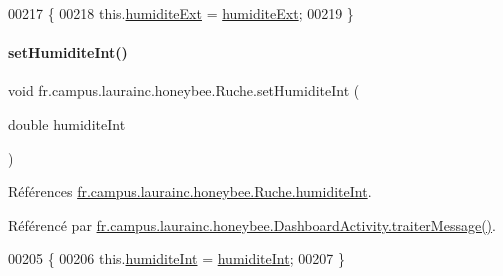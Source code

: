 \begin{DoxyCode}
00217                                                    \{
00218         this.\hyperlink{classfr_1_1campus_1_1laurainc_1_1honeybee_1_1_ruche_affacf72018828f470b5c69c1cc4f06a6}{humiditeExt} = \hyperlink{classfr_1_1campus_1_1laurainc_1_1honeybee_1_1_ruche_affacf72018828f470b5c69c1cc4f06a6}{humiditeExt};
00219     \}
\end{DoxyCode}
\mbox{\label{classfr_1_1campus_1_1laurainc_1_1honeybee_1_1_ruche_a1a5bbd259b54c895833c9e3710d2eead}} 
\paragraph{\texorpdfstring{set\+Humidite\+Int()}{setHumiditeInt()}}
{\footnotesize\ttfamily void fr.\+campus.\+laurainc.\+honeybee.\+Ruche.\+set\+Humidite\+Int (\begin{DoxyParamCaption}\item[{double}]{humidite\+Int }\end{DoxyParamCaption})}



Références \hyperlink{classfr_1_1campus_1_1laurainc_1_1honeybee_1_1_ruche_ad56a25b2e432592a20a5f7f4347f92f9}{fr.\+campus.\+laurainc.\+honeybee.\+Ruche.\+humidite\+Int}.



Référencé par \hyperlink{classfr_1_1campus_1_1laurainc_1_1honeybee_1_1_dashboard_activity_a50d4c14e993ff1779ae5dce8cee11216}{fr.\+campus.\+laurainc.\+honeybee.\+Dashboard\+Activity.\+traiter\+Message()}.


\begin{DoxyCode}
00205                                                    \{
00206         this.\hyperlink{classfr_1_1campus_1_1laurainc_1_1honeybee_1_1_ruche_ad56a25b2e432592a20a5f7f4347f92f9}{humiditeInt} = \hyperlink{classfr_1_1campus_1_1laurainc_1_1honeybee_1_1_ruche_ad56a25b2e432592a20a5f7f4347f92f9}{humiditeInt};
00207     \}
\end{DoxyCode}
\mbox{\label{classfr_1_1campus_1_1laurainc_1_1honeybee_1_1_ruche_a0d85ef1bc9f53591e6cf0cc8667fbe2d}} 
